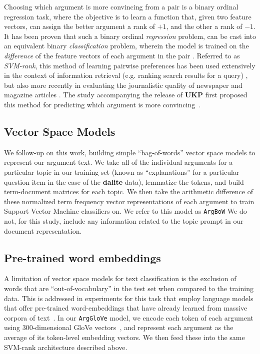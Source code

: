 \documentclass[runningheads]{llncs}
\begin{document}
Choosing which argument is more convincing from a pair is a binary 
ordinal regression task, where the objective is to learn a function that, given 
two feature vectors, can assign the better argument a rank of $+1$, and the 
other a rank of $-1$.   
It has been proven that such a binary ordinal \textit{regression} problem, can 
be cast into an equivalent binary \textit{classification} problem, wherein the 
model is trained on the \textit{difference} of the feature vectors of each 
argument in the pair \cite{herbrich_support_1999}. 
Referred to as \textit{SVM-rank}, this method of learning pairwise preferences 
has been used extensively in the context of information retrieval (e.g. ranking 
search results for a query) 
\cite{joachims_optimizing_2002}, but also more recently in evaluating the 
journalistic quality of newspaper and magazine articles \cite{louis_what_2013}.
The study accompanying the release of \textbf{UKP} first proposed this method 
for predicting which argument is more convincing~\cite{habernal_which_2016}.

\subsection{Vector Space Models}

We follow-up on this work, building simple ``bag-of-words'' vector space models 
to represent our argument text. 
We take all of the individual arguments for a particular topic in our training 
set (known as  ``explanations'' for a particular question item in the case of 
the \textbf{dalite} data), lemmatize the tokens, and build term-document 
matrices for each topic.
We then take the arithmetic difference of these normalized term frequency 
vector representations of each argument to train Support Vector Machine 
classifiers on. 
We refer to this model as \verb|ArgBoW| 
We do not, for this study, include any information related to the topic prompt 
in our document representation.


\subsection{Pre-trained word embeddings}
A limitation of vector space models for text classification is the exclusion of 
words that are ``out-of-vocabulary'' in the test set when compared to the 
training data.
This is addressed in experiments for this task that employ language models that 
offer pre-trained word-embeddings that have already learned from massive 
corpora of text~\cite{habernal_which_2016}\cite{gleize_are_2019}.    
In our \verb|ArgGloVe| model, we encode each token of each argument using 
300-dimensional GloVe vectors~\cite{pennington_glove:_2014}, 
and represent each argument as the average of its token-level embedding 
vectors. 
We then feed these into the same SVM-rank architecture described above. 
\end{document}
